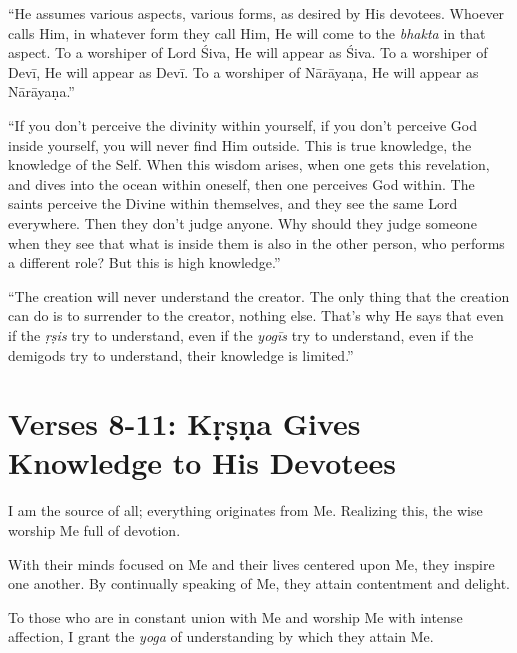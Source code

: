 \enquote{He assumes various aspects, various forms, as desired by His devotees. Whoever calls Him, in whatever form they call Him, He will come to the \textit{bhakta} in that aspect. To a worshiper of Lord Śiva, He will appear as Śiva. To a worshiper of Devī, He will appear as Devī. To a worshiper of Nārāyaṇa, He will appear as Nārāyaṇa.}

\enquote{If you don’t perceive the divinity within yourself, if you don’t perceive God inside yourself, you will never find Him outside. This is true knowledge, the knowledge of the Self. When this wisdom arises, when one gets this revelation, and dives into the ocean within oneself, then one perceives God within. The saints perceive the Divine within themselves, and they see the same Lord everywhere. Then they don’t judge anyone. Why should they judge someone when they see that what is inside them is also in the other person, who performs a different role? But this is high knowledge.}

\enquote{The creation will never understand the creator. The only thing that the creation can do is to surrender to the creator, nothing else. That’s why He says that even if the \textit{ṛṣis} try to understand, even if the \textit{yogīs} try to understand, even if the demigods try to understand, their knowledge is limited.}

\newpage
\section{Verses 8-11: Kṛṣṇa Gives Knowledge to His Devotees}\label{sec-verses-8-11-krsna-gives-knowledge-to-his-devotees}

{I am the source of all; everything originates from Me. Realizing this, the wise worship Me full of devotion.}

{With their minds focused on Me and their lives centered upon Me, they inspire one another. By continually speaking of Me, they attain contentment and delight.}

{To those who are in constant union with Me and worship Me with intense affection, I grant the \textit{yoga} of understanding by which they attain Me.}

